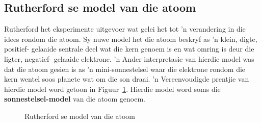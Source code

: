             \subsection*{Rutherford se model van die atoom}
            \nopagebreak
\begin{minipage}{.5\textwidth}
            \label{m38756*id254751}
Rutherford het eksperimente uitgevoer wat gelei het tot  'n verandering in die idees rondom die atoom. Sy nuwe model het die atoom beskryf as  'n klein, digte, positief- gelaaide sentrale deel wat die kern genoem is en wat omring is deur die ligter, negatief- gelaaide elektrone.  'n
Ander interpretasie van hierdie model was dat die atoom gesien is as  'n mini-sonnestelsel waar die elektrone rondom die kern wentel
soos planete wat om die son draai.  'n Vereenvoudigde prentjie van hierdie model word getoon in Figuur~\ref{fig:atom:rutherfordmodel}. Hierdie model word soms die \textbf{sonnestelsel-model} van die atoom genoem. \par 
\end{minipage}
\begin{minipage}{.5\textwidth}
    \setcounter{subfigure}{0}
	\begin{figure}[H] %
    \begin{center}
\caption{Rutherford se model van die atoom}
\end{center}
\label{fig:atom:rutherfordmodel}
 \end{figure} 
\end{minipage}      
      \label{m38756*uid6}
